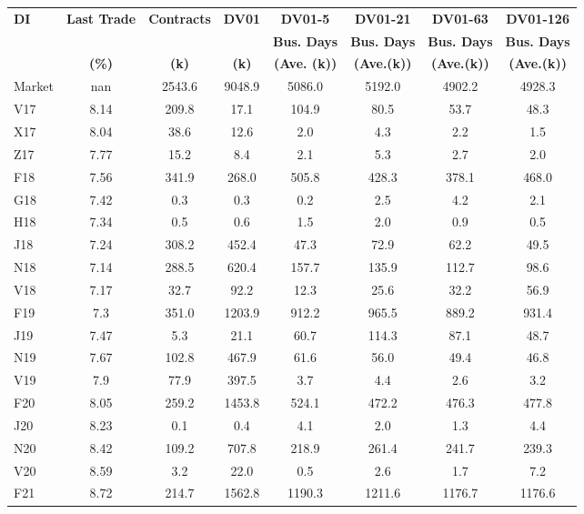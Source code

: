 \documentclass[article,crop=false]{standalone}%
\begin{document}
%
\normalsize%
\setlength{\tabcolsep}{0.15cm}%
\begin{tabular}[h]{l c c c c c c c}%
\hline%
\rowcolor{white}%
\textbf{DI}&\textbf{Last Trade}&\textbf{Contracts}&\textbf{DV01}&\textbf{DV01{-}5}&\textbf{DV01{-}21}&\textbf{DV01{-}63}&\textbf{DV01{-}126}\\%
\rowcolor{white}%
\textbf{}&\textbf{}&\textbf{}&\textbf{}&\textbf{Bus. Days}&\textbf{Bus. Days}&\textbf{Bus. Days}&\textbf{Bus. Days}\\%
\rowcolor{white}%
\textbf{}&\textbf{(\%)}&\textbf{(k)}&\textbf{(k)}&\textbf{(Ave. (k))}&\textbf{(Ave.(k))}&\textbf{(Ave.(k))}&\textbf{(Ave.(k))}\\%
\hline%
\rowcolor{gray}%
Market&nan&2543.6&9048.9&5086.0&5192.0&4902.2&4928.3\\%
\rowcolor{white}%
V17&8.14&209.8&17.1&104.9&80.5&53.7&48.3\\%
\rowcolor{lightgray}%
X17&8.04&38.6&12.6&2.0&4.3&2.2&1.5\\%
\rowcolor{white}%
Z17&7.77&15.2&8.4&2.1&5.3&2.7&2.0\\%
\rowcolor{lightgray}%
F18&7.56&341.9&268.0&505.8&428.3&378.1&468.0\\%
\rowcolor{white}%
G18&7.42&0.3&0.3&0.2&2.5&4.2&2.1\\%
\rowcolor{lightgray}%
H18&7.34&0.5&0.6&1.5&2.0&0.9&0.5\\%
\rowcolor{white}%
J18&7.24&308.2&452.4&47.3&72.9&62.2&49.5\\%
\rowcolor{lightgray}%
N18&7.14&288.5&620.4&157.7&135.9&112.7&98.6\\%
\rowcolor{white}%
V18&7.17&32.7&92.2&12.3&25.6&32.2&56.9\\%
\rowcolor{lightgray}%
F19&7.3&351.0&1203.9&912.2&965.5&889.2&931.4\\%
\rowcolor{white}%
J19&7.47&5.3&21.1&60.7&114.3&87.1&48.7\\%
\rowcolor{lightgray}%
N19&7.67&102.8&467.9&61.6&56.0&49.4&46.8\\%
\rowcolor{white}%
V19&7.9&77.9&397.5&3.7&4.4&2.6&3.2\\%
\rowcolor{lightgray}%
F20&8.05&259.2&1453.8&524.1&472.2&476.3&477.8\\%
\rowcolor{white}%
J20&8.23&0.1&0.4&4.1&2.0&1.3&4.4\\%
\rowcolor{lightgray}%
N20&8.42&109.2&707.8&218.9&261.4&241.7&239.3\\%
\rowcolor{white}%
V20&8.59&3.2&22.0&0.5&2.6&1.7&7.2\\%
\rowcolor{lightgray}%
F21&8.72&214.7&1562.8&1190.3&1211.6&1176.7&1176.6\\%

\end{tabular}
\end{document}
